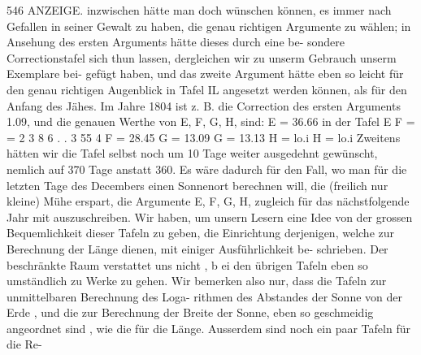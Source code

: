 \documentclass[12pt,a4paper]{article}
\begin{document}
\newpage
546 ANZEIGE.\newline
inzwischen hätte man doch wünschen können, es immer nach Gefallen in seiner Gewalt zu haben, die\newline
genau richtigen Argumente zu wählen; in Ansehung des ersten Arguments hätte dieses durch eine be-\newline
sondere Correctionstafel sich thun lassen, dergleichen wir zu unserm Gebrauch unserm Exemplare bei-\newline
gefügt haben, und das zweite Argument hätte eben so leicht für den genau richtigen Augenblick in\newline
Tafel IL angesetzt werden können, als für den Anfang des Jähes. Im Jahre 1804 ist z. B. die Correction\newline
des ersten Arguments 1.09, und die genauen Werthe von E, F, G, H, sind:\newline
E = 36.66 in der Tafel E F = = 2 3 8 6 . . 3 55 4\newline
F = 28.45\newline
G = 13.09\newline
G = 13.13\newline
H = lo.i H = lo.i\newline
Zweitens hätten wir die Tafel selbst noch um 10 Tage weiter ausgedehnt gewünscht, nemlich\newline
auf 370 Tage anstatt 360. Es wäre dadurch für den Fall, wo man für die letzten Tage des Decembers\newline
einen Sonnenort berechnen will, die (freilich nur kleine) Mühe erspart, die Argumente E, F, G, H,\newline
zugleich für das nächstfolgende Jahr mit auszuschreiben.\newline
Wir haben, um unsern Lesern eine Idee von der grossen Bequemlichkeit dieser Tafeln zu geben,\newline
die Einrichtung derjenigen, welche zur Berechnung der Länge dienen, mit einiger Ausführlichkeit be-\newline
schrieben. Der beschränkte Raum verstattet uns nicht , b ei den übrigen Tafeln eben so umständlich zu\newline
Werke zu gehen. Wir bemerken also nur, dass die Tafeln zur unmittelbaren Berechnung des Loga-\newline
rithmen des Abstandes der Sonne von der Erde , und die zur Berechnung der Breite der Sonne, eben so\newline
geschmeidig angeordnet sind , wie die für die Länge. Ausserdem sind noch ein paar Tafeln für die Re-\newline
\end{document}
